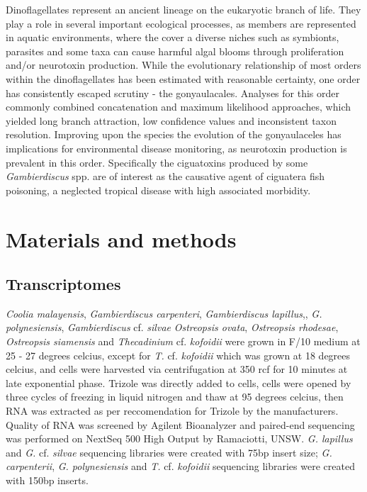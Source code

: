 \documentclass[12pt]{article}
\begin{document}
Dinoflagellates represent an ancient lineage on the eukaryotic branch of life. 
They play a role in several important ecological processes, as members are represented in aquatic environments, where the cover a diverse niches such as symbionts, parasites and some taxa can cause harmful algal blooms through proliferation and/or neurotoxin production.
While the evolutionary relationship of most orders within the dinoflagellates has been estimated with reasonable certainty, one order has consistently escaped scrutiny - the gonyaulacales. 
Analyses for this order commonly combined concatenation and maximum likelihood approaches, which yielded long branch attraction, low confidence values and inconsistent taxon resolution. 
Improving upon the species the evolution of the gonyaulaceles has implications for environmental disease monitoring, as neurotoxin production is prevalent in this order. 
Specifically the ciguatoxins produced by some \emph{Gambierdiscus} spp. are of interest as the causative agent of ciguatera fish poisoning, a neglected tropical disease with high associated morbidity.%


\newpage

\section{Materials and methods}


\subsection*{Transcriptomes}
\emph{Coolia malayensis}, \emph{Gambierdiscus carpenteri}, \emph{Gambierdiscus lapillus},, \emph{G. polynesiensis}, \emph{Gambierdiscus} cf. \emph{silvae} \emph{Ostreopsis ovata}, \emph{Ostreopsis rhodesae}, \emph{Ostreopsis siamensis} and \emph{Thecadinium} cf. \emph{kofoidii} were grown in F/10 medium at 25 - 27 degrees celcius, except for \emph{T.} cf. \emph{kofoidii} which was grown at 18 degrees celcius, and cells were harvested via centrifugation at 350 rcf for 10 minutes at late exponential phase. Trizole was directly added to cells, cells were opened by three cycles of freezing in liquid nitrogen and thaw at 95 degrees celcius, then RNA was extracted as per reccomendation for Trizole by the manufacturers. Quality of RNA was screened by Agilent Bioanalyzer and paired-end sequencing was performed on NextSeq 500 High Output by Ramaciotti, UNSW. \emph{G. lapillus} and \emph{G.} cf. \emph{silvae} sequencing libraries were created with 75bp insert size; \emph{G. carpenterii}, \emph{G. polynesiensis} and \emph{T.} cf. \emph{kofoidii} sequencing libraries were created with 150bp inserts.
\end{document}
